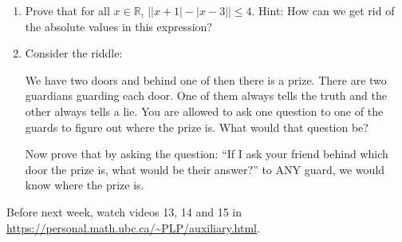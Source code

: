 \documentclass[12pt]{article}
\begin{document}
\begin{enumerate}
\item Prove that for all $x\in\mathbb R$, $\left| |x+1|-|x-3| \right|\leq 4$.
Hint: How can we get rid of the absolute values in this expression?

\item Consider the riddle:
\begin{center}
We have two doors and behind one of then there is a prize. There are two guardians guarding each door. One of them always tells the truth and the other always tells a lie. You are allowed to ask one question to one of the guards to figure out where the prize is. What would that question be?
\end{center}

Now prove that by asking the question: ``If I ask your friend behind which door the prize is, what would be their answer?'' to ANY guard, we would know where the prize is.

\end{enumerate}

Before next week, watch videos 13, 14 and 15 in \url{https://personal.math.ubc.ca/~PLP/auxiliary.html}.
\end{document}

